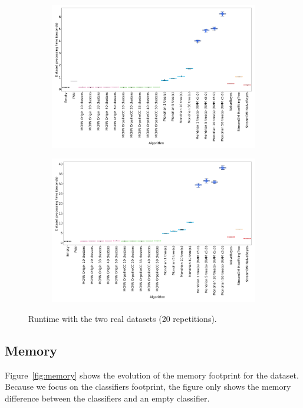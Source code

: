 \begin{figure}
	\begin{subfigure}[t]{.49\linewidth}
		\includegraphics[width=\linewidth]{figures/results/banos_6_runtime.png}
		\caption{\banosdataset}
		\label{fig:runtime-banos}
	\end{subfigure}
	\hfill
	\begin{subfigure}[t]{.49\linewidth}
		\includegraphics[width=\linewidth]{figures/results/recofit_6_runtime.png}
		\caption{\recofitdataset}
		\label{fig:runtime-recofit}
	\end{subfigure}
	\caption{Runtime with the two real datasets (20 repetitions).}
	\label{fig:runtime}
\end{figure}

\subsection{Memory}
\label{sec:result-memory}
Figure~\ref{fig:memory} shows the evolution of the memory footprint for the
\banosdataset dataset. Because we focus on the classifiers footprint, the
figure only shows the memory difference between the classifiers and an empty
classifier. 

